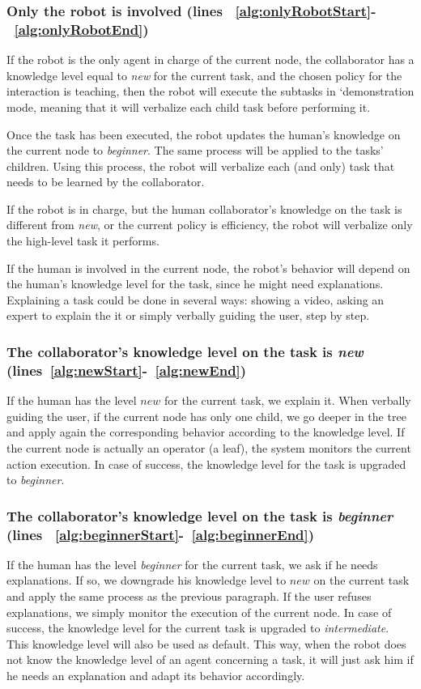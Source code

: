 \subsubsection{Only the robot is involved (lines ~\ref{alg:onlyRobotStart}-~\ref{alg:onlyRobotEnd})}
If the robot is the only agent in charge of the current node, the collaborator has a knowledge level equal to \textit{new} for the current task,
and the chosen policy for the interaction is teaching, then the robot will execute the subtasks in `demonstration mode, meaning that it will verbalize each child task before performing it.

Once the task has been executed, the robot updates the human's knowledge on the current node to \textit{beginner}. The same process will be applied to the tasks' children.  Using this process, the robot will verbalize each (and only) task that needs to be learned by the collaborator.

If the robot is in charge, but the human collaborator's knowledge on the task is different from \textit{new}, or the current policy is efficiency, the robot will verbalize only the high-level task it performs.

If the human is involved in the current node, the robot's behavior will depend on the human's knowledge level for the task, since he might need explanations.  Explaining a task could be done in several ways: showing a video, asking an expert to explain the it or simply verbally guiding the user, step by step.
\subsubsection{The collaborator's knowledge level on the task is \textit{new} (lines~\ref{alg:newStart}-~\ref{alg:newEnd})}
If the human has the level $new$ for the current task, we explain it.
When verbally guiding the user, if the current node has only one child, we  go deeper in the tree and apply again the corresponding behavior according to the knowledge level. If the current node is actually an operator (a leaf), the system monitors the current action execution. In case of success, the knowledge level for the task is upgraded to \textit{beginner}.

\subsubsection{The collaborator's knowledge level on the task is \textit{beginner} (lines ~\ref{alg:beginnerStart}-~\ref{alg:beginnerEnd})}
 If the human has the level \textit{beginner} for the current task, we ask if he needs explanations. If so, we downgrade his knowledge level to $new$ on the current task and apply the same process as the previous paragraph. If the user refuses explanations, we simply monitor the execution of the current node. In case of success, the knowledge level for the current task is upgraded to \textit{intermediate}. This knowledge level will also be used as default. This way, when the robot does not know the knowledge level of an agent concerning a task, it will just ask him if he needs an explanation and adapt its behavior accordingly.

